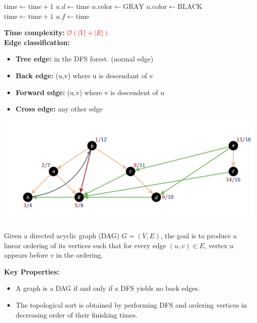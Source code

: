 \documentclass[a4paper,landscape]{article}
\newcommand{\timecomplexity}[1]{\textcolor{red}{#1}}
\newcommand{\bigo}{\mathcal{O}}
\begin{document}
\begin{multicols}{7}
{\begin{minipage}{1.25\linewidth}
\begin{algorithmic}[1]
        \State $\text{time} \gets \text{time} + 1$
        \State $u.d \gets \text{time}$ 
        \State $u.\text{color} \gets \text{GRAY}$
                \State {}
            \EndIf
        \EndFor
        \State $u.\text{color} \gets \text{BLACK}$ 
        \State $\text{time} \gets \text{time} + 1$
        \State $u.f \gets \text{time}$
    \EndProcedure
\end{algorithmic}
\end{minipage}%
}
\textbf{Time complexity:} \timecomplexity{\(\bigo(|V| + |E|)\)} \\
\textbf{Edge classification:}
\begin{itemize}
    \item \textbf{\color{orange}Tree edge:} in the DFS forest. (normal edge)
    \item \textbf{\color{blue}Back edge:} (u,v) where u is descendant of v
    \item \textbf{\color{red}Forward edge:} (u,v) where v is descendent of u
    \item \textbf{\color{green}Cross edge:} any other edge
\end{itemize}
\noindent
\includegraphics[width=\textwidth]{DFS}%
\endtcolorbox

\tcolorbox[mybox={Topological Sort}]
Given a directed acyclic graph (DAG) $G = (V, E)$, the goal is to produce a linear ordering of its vertices such that for every edge $(u, v) \in E$, vertex $u$ appears before $v$ in the ordering.

\textbf{Key Properties:}
\begin{itemize}[noitemsep, topsep=0pt]
    \item A graph is a DAG if and only if a DFS yields no back edges.
    \item The topological sort is obtained by performing DFS and ordering vertices in decreasing order of their finishing times.
\end{itemize}


\end{multicols}
\end{document}

